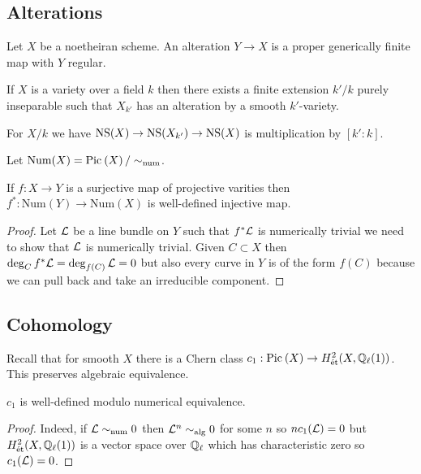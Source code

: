 \documentclass[12pt]{article}
\begin{document}
\subsection{Alterations}

\begin{defn}
Let $X$ be a noetheiran scheme. An alteration $Y \to X$ is a proper generically finite map with $Y$ regular.
\end{defn}

\begin{prop}
If $X$ is a variety over a field $k$ then there exists a finite extension $k' / k$ purely inseparable such that $X_{k'}$ has an alteration by a smooth $k'$-variety. 
\end{prop}

For $X / k$ we have $\mathrm{NS}(X) \to \mathrm{NS}(X_{k'}) \to \mathrm{NS}(X)$ is multiplication by $[k' : k]$. 

\newcommand{\Num}{\mathrm{Num}}

\begin{defn}
Let $\Num(X) = \Pic{X} / \sim_{\text{num}}$.
\end{defn}

\begin{prop}
If $f : X \to Y$ is a surjective map of projective varities then $f^* : \Num(Y) \to \Num(X)$ is well-defined injective map. 
\end{prop}

\begin{proof}
Let $\mathcal{L}$ be a line bundle on $Y$ such that $f^* \mathcal{L}$ is numerically trivial we need to show that $\mathcal{L}$ is numerically trivial. Given $C \subset X$ then $\deg_C f^* \mathcal{L} = \deg_{f(C)} \mathcal{L} = 0$ but also every curve in $Y$ is of the form $f(C)$ because we can pull back and take an irreducible component. 
\end{proof}

\subsection{\etale Cohomology}

Recall that for smooth $X$ there is a Chern class $c_1 : \mathrm{Pic}^{} \left( X \right) \to H^2_{\text{\'{e}t}}(X, \mathbb{Q}_\ell(1))$. This preserves algebraic equivalence. 

\begin{lemma}
$c_1$ is well-defined modulo numerical equivalence.
\end{lemma}

\begin{proof}
Indeed, if $\mathcal{L} \sim_{\text{num}} 0$ then $\mathcal{L}^n \sim_{\text{alg}} 0$ for some $n$ so $n c_1(\mathcal{L}) = 0$ but $H^2_{\text{\'{e}t}}(X, \mathbb{Q}_{\ell}(1))$ is a vector space over $\mathbb{Q}_\ell$ which has characteristic zero so $c_1(\mathcal{L}) = 0$.
\end{proof}
\end{document}
